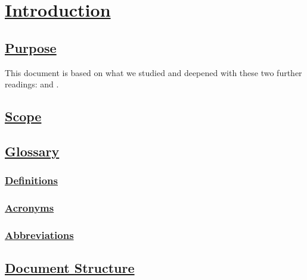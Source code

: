 \section[Introduction]{\hyperlink{toc}{Introduction}}
\subsection[Purpose]{\hyperlink{toc}{Purpose}}
This document is based on what we studied and deepened with these two further readings: \cite{IEEErasd} and \cite{IEEEre}.

\subsection[Scope]{\hyperlink{toc}{Scope}}

\subsection[Glossary]{\hyperlink{toc}{Glossary}}
	\subsubsection[Definitions]{\hyperlink{toc}{Definitions}}
	\subsubsection[Acronyms]{\hyperlink{toc}{Acronyms}}
	\subsubsection[Abbreviations]{\hyperlink{toc}{Abbreviations}}
	
		
\subsection[Document Structure]{\hyperlink{toc}{Document Structure}}	

